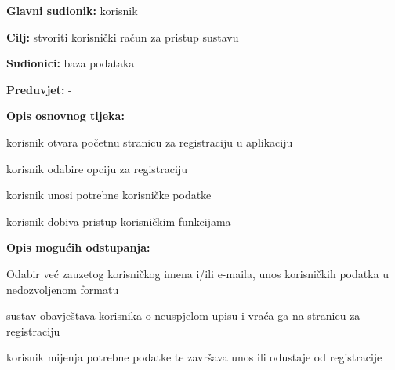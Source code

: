 					\noindent {}
					\begin{packed_item}
	
						\item \textbf{Glavni sudionik: }korisnik
						\item  \textbf{Cilj:} stvoriti korisnički račun za pristup sustavu
						\item  \textbf{Sudionici:} baza podataka
						\item  \textbf{Preduvjet:} -
						\item  \textbf{Opis osnovnog tijeka:}
						
						\item[] \begin{packed_enum}
							\item korisnik otvara početnu stranicu za registraciju u aplikaciju
							\item korisnik odabire opciju za registraciju
							\item korisnik unosi potrebne korisničke podatke
							\item korisnik dobiva pristup korisničkim funkcijama

						\end{packed_enum}
						
						\item  \textbf{Opis mogućih odstupanja:}
						
						\item[] \begin{packed_item}
	
							\item[2.a] Odabir već zauzetog korisničkog imena i/ili e-maila, unos korisničkih podatka u nedozvoljenom formatu
							\item[] \begin{packed_enum}
								
								\item sustav obavještava korisnika o neuspjelom upisu i vraća ga na stranicu za registraciju
								\item korisnik mijenja potrebne podatke te završava unos ili odustaje od registracije
							\end{packed_enum}
							
						\end{packed_item}
					\end{packed_item}

